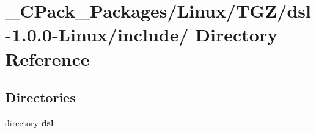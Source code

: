 \section{\_\-CPack\_\-Packages/Linux/TGZ/dsl-\/1.0.0-\/Linux/include/ Directory Reference}
\label{dir_fc2def683ae2cea19a37ee2509ddc574}
\subsection*{Directories}
\begin{DoxyCompactItemize}
\item 
directory {\bf dsl}
\end{DoxyCompactItemize}
